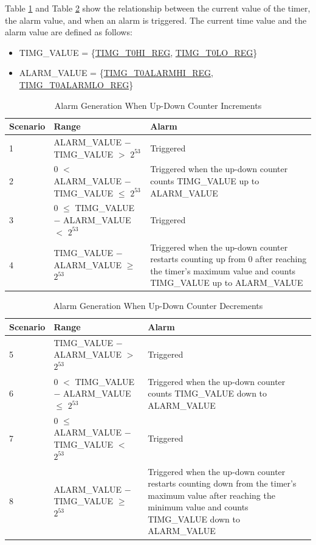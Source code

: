 \documentclass[main\_\_EN.tex]{subfiles}
\begin{document}
Table \ref{tab:timg-alarm-generation-up} and Table \ref{tab:timg-alarm-generation-down} show the relationship between the current value of the timer, the alarm value, and when an alarm is triggered. The current time value and the alarm value are defined as follows:

\begin{itemize}
    \item TIMG\_VALUE = \{\hyperref[regdesc:TIMGTXHIREG]{TIMG\_T0HI\_REG}, \hyperref[regdesc:TIMGTXLOREG]{TIMG\_T0LO\_REG}\}
    \item ALARM\_VALUE = \{\hyperref[regdesc:TIMGTXALARMHIREG]{TIMG\_T0ALARMHI\_REG}, \hyperref[regdesc:TIMGTXALARMLOREG]{TIMG\_T0ALARMLO\_REG}\}
\end{itemize}


\begin{table}[H]
\centering
\caption{Alarm Generation When Up-Down Counter Increments}
\label{tab:timg-alarm-generation-up}

\begin{tabular}{|l|l|m{7cm}|}
\hline
\rowcolor{lightgray}
    \textbf{Scenario} & \textbf{Range} & \textbf{Alarm} \\\hline
     1 & ALARM\_VALUE $-$ TIMG\_VALUE $>$ $2^{53}$ & Triggered \\\hline
     2 & 0 $<$ ALARM\_VALUE $-$ TIMG\_VALUE $\leq$ $2^{53}$ & Triggered when the up-down counter counts TIMG\_VALUE up to ALARM\_VALUE \\\hline
     3 & 0 $\leq$ TIMG\_VALUE $-$ ALARM\_VALUE $<$ $2^{53}$ & Triggered \\\hline
     4 & TIMG\_VALUE $-$ ALARM\_VALUE $\geq$ $2^{53}$ & Triggered when the up-down counter restarts counting up from 0 after reaching the timer's maximum value and counts TIMG\_VALUE up to ALARM\_VALUE \\\hline

\end{tabular}
\end{table}

\begin{table}[H]
\centering
\caption{Alarm Generation When Up-Down Counter Decrements}
\label{tab:timg-alarm-generation-down}

\begin{tabular}{|l|l|m{7cm}|}
\hline
\rowcolor{lightgray}
    \textbf{Scenario} & \textbf{Range} & \textbf{Alarm} \\\hline
     5 & TIMG\_VALUE $-$ ALARM\_VALUE  $>$ $2^{53}$ & Triggered \\\hline
     6 &  0 $<$ TIMG\_VALUE $-$ ALARM\_VALUE $\leq$ $2^{53}$ & Triggered when the up-down counter counts TIMG\_VALUE down to ALARM\_VALUE \\\hline
     7 & 0 $\leq$ ALARM\_VALUE $-$ TIMG\_VALUE $<$ $2^{53}$ & Triggered \\\hline
     8 & ALARM\_VALUE $-$ TIMG\_VALUE $\geq$ $2^{53}$ & Triggered when the up-down counter restarts counting down from the timer's maximum value after reaching the minimum value and counts TIMG\_VALUE down to ALARM\_VALUE \\\hline

\end{tabular}
\end{table}
\end{document}
